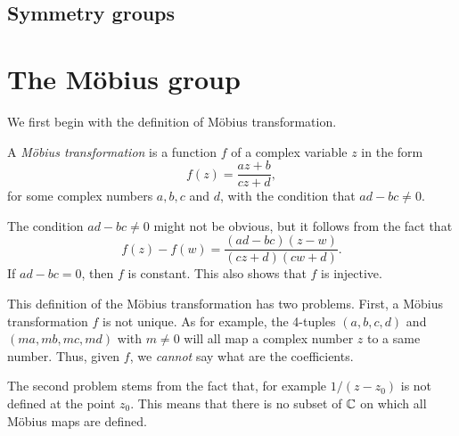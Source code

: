 \documentclass[main.tex]{subfiles}
\begin{document}
	\subsection{Symmetry groups}
		
	\section{The M\"obius group}
		We first begin with the definition of M\"obius transformation.
		\begin{definition}
			A \textit{M\"obius transformation} is a function $f$ of a complex variable $z$ in the form
			\begin{equation*}
				f(z) = \frac{az + b}{cz + d},
			\end{equation*}
			for some complex numbers $a, b, c$ and $d$, with the condition that $ad - bc \neq 0$.
		\end{definition}
		The condition $ad - bc \neq 0$ might not be obvious, but it follows from the fact that
		\begin{equation*}
			f(z) - f(w) = \frac{(ad - bc)(z - w)}{(cz+d)(cw + d)}.
		\end{equation*}
		If $ad - bc = 0$, then $f$ is constant. This also shows that $f$ is injective.
		
		This definition of the M\"obius transformation has two problems. First, a M\"obius transformation $f$ is not unique. As for example, the 4-tuples $(a,b,c,d)$ and $(ma, mb, mc, md)$ with $m \neq 0$ will all map a complex number $z$ to a same number. Thus, given $f$, we \textit{cannot} say what are the coefficients.
		
		The second problem stems from the fact that, for example $1/(z - z_0)$ is not defined at the point $z_0$. This means that there is no subset of $\mathbb C$ on which all M\"obius maps are defined.
		
\end{document}
